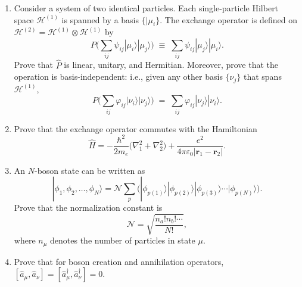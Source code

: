 \documentclass[pra,12pt]{revtex4}
\begin{document}
\begin{enumerate}
\item Consider a system of two identical particles.  Each
  single-particle Hilbert space $\mathscr{H}^{(1)}$ is spanned by a
  basis $\{|\mu_i\}$.  The exchange operator is defined on
  $\mathscr{H}^{(2)} = \mathscr{H}^{(1)} \otimes \mathscr{H}^{(1)}$ by
  \begin{equation}
    P \Big (\sum_{ij} \psi_{ij} |\mu_i\rangle|\mu_j\rangle \Big)
    \;\equiv\;  \sum_{ij} \psi_{ij} |\mu_j\rangle|\mu_i\rangle.
  \end{equation}
  Prove that $\hat{P}$ is linear, unitary, and Hermitian.  Moreover,
  prove that the operation is basis-independent: i.e., given any other
  basis $\{\nu_j\}$ that spans $\mathscr{H}^{(1)}$,
  \begin{equation}
    P \Big (\sum_{ij} \varphi_{ij} |\nu_i\rangle|\nu_j\rangle \Big)
    \;=\;  \sum_{ij} \varphi_{ij} |\nu_j\rangle|\nu_i\rangle.
  \end{equation}
  \label{ex:1}

\item
  Prove that the exchange operator commutes with the Hamiltonian
  \begin{equation}
    \hat{H} = - \frac{\hbar^2}{2m_e} \Big(\nabla_1^2 + \nabla^2_2\Big) + \frac{e^2}{4\pi\varepsilon_0|\mathbf{r}_1 - \mathbf{r}_2|}.
  \end{equation}
  \label{ex:2}

\item
  An $N$-boson state can be written as
  \begin{equation}
    |\phi_1,\phi_2,\dots,\phi_N\rangle = \mathcal{N} \sum_p \Big(|\phi_{p(1)}\rangle  |\phi_{p(2)}\rangle  |\phi_{p(3)}\rangle  \cdots  |\phi_{p(N)}\rangle\Big).
  \end{equation}
  Prove that the normalization constant is
  \begin{equation}
    \mathcal{N} = \sqrt{\frac{n_a!n_b!\cdots}{N!}},
  \end{equation}
  where $n_\mu$ denotes the number of particles in state $\mu$.
  \label{ex:boson_norm}

\item
  Prove that for boson creation and annihilation operators, $[\hat{a}_\mu,\hat{a}_\nu] = [\hat{a}_\mu^\dagger,\hat{a}_\nu^\dagger] = 0$.
  \label{ex:boson_commutators}


\end{enumerate}
\end{document}
